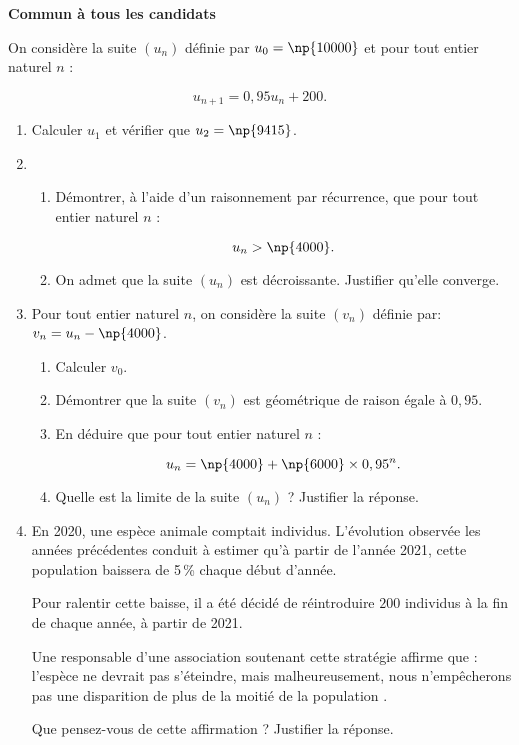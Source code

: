 
\textbf{Commun à tous les candidats}

\medskip

On considère la suite $\left(u_n\right)$ définie par $u_0 = \np{10000}$ et pour tout entier naturel $n$ : 

\[u_{n+1} = 0,95u_n + 200.\]

\begin{enumerate}
\item Calculer $u_1$ et vérifier que $u_2 = \np{9415}$. 
\item 
	\begin{enumerate}
		\item Démontrer, à l'aide d'un raisonnement par récurrence, que pour tout entier naturel $n$ :

\[u_n > \np{4000}.\]

		\item On admet que la suite $\left(u_n\right)$ est décroissante. Justifier qu'elle converge.
	\end{enumerate}
\item  Pour tout entier naturel $n$, on considère la suite $\left(v_n\right)$ définie par: $v_n = u_n - \np{4000}$.
	\begin{enumerate}
		\item Calculer $v_0$.
		\item Démontrer que la suite $\left(v_n\right)$ est géométrique de raison égale à $0,95$.
		\item En déduire que pour tout entier naturel $n$ :

\[u_n = \np{4000} + \np{6000} \times 0,95^n.\]

		\item Quelle est la limite de la suite $\left(u_n\right)$ ? Justifier la réponse.
	\end{enumerate}
\item En 2020, une espèce animale comptait  individus. L'évolution observée les années précédentes conduit à estimer qu'à partir de l'année 2021, cette population baissera de 5\,\% chaque début d'année.

Pour ralentir cette baisse, il a été décidé de réintroduire $200$ individus à la fin de chaque année, à partir de 2021.

Une responsable d'une association soutenant cette stratégie affirme que : \og l'espèce ne devrait pas s'éteindre, mais malheureusement, nous n'empêcherons pas une disparition de plus de la moitié de la population \fg.

Que pensez-vous de cette affirmation ? Justifier la réponse.
\end{enumerate}

\bigskip

